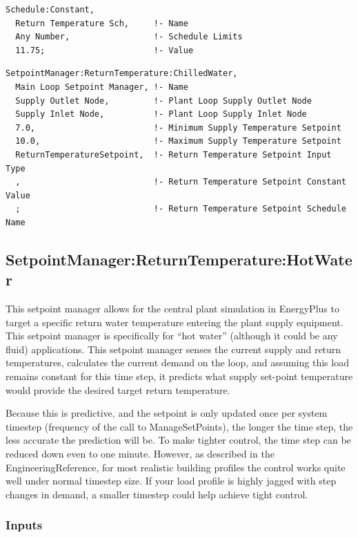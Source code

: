 \begin{lstlisting}
Schedule:Constant,
  Return Temperature Sch,     !- Name
  Any Number,                 !- Schedule Limits
  11.75;                      !- Value
\end{lstlisting}

\begin{lstlisting}
SetpointManager:ReturnTemperature:ChilledWater,
  Main Loop Setpoint Manager, !- Name
  Supply Outlet Node,         !- Plant Loop Supply Outlet Node
  Supply Inlet Node,          !- Plant Loop Supply Inlet Node
  7.0,                        !- Minimum Supply Temperature Setpoint
  10.0,                       !- Maximum Supply Temperature Setpoint
  ReturnTemperatureSetpoint,  !- Return Temperature Setpoint Input Type
  ,                           !- Return Temperature Setpoint Constant Value
  ;                           !- Return Temperature Setpoint Schedule Name
\end{lstlisting}

\subsection{SetpointManager:ReturnTemperature:HotWater}\label{setpointmanagerreturntemperaturehotwater}

This setpoint manager allows for the central plant simulation in EnergyPlus to target a specific return water temperature entering the plant supply equipment. This setpoint manager is specifically for ``hot water'' (although it could be any fluid) applications. This setpoint manager senses the current supply and return temperatures, calculates the current demand on the loop, and assuming this load remains constant for this time step, it predicts what supply set-point temperature would provide the desired target return temperature.

Because this is predictive, and the setpoint is only updated once per system timestep (frequency of the call to ManageSetPoints), the longer the time step, the less accurate the prediction will be. To make tighter control, the time step can be reduced down even to one minute. However, as described in the EngineeringReference, for most realistic building profiles the control works quite well under normal timestep size. If your load profile is highly jagged with step changes in demand, a smaller timestep could help achieve tight control.

\subsubsection{Inputs}\label{inputs-27-001}

